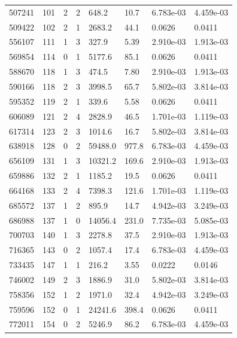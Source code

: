 \documentclass[preview]{standalone}
\begin{document}
{{{\begin{tabular}{L{1.2cm}C{1.2cm} C{0.3cm}C{0.5cm} C{1.4cm}C{1.4cm} C{1.4cm}C{1.4cm}}
  507241  &   101  & 2     &  2 &  648.2  & 10.7  & 6.783e-03 &  4.459e-03   \\ 
  509422  &   102  & 2     &  1 &  2683.2  & 44.1  & 0.0626 &  0.0411   \\ 
  556107  &   111  & 1     &  3 &  327.9  & 5.39  & 2.910e-03 &  1.913e-03   \\ 
  569854  &   114  & 0     &  1 &  5177.6  & 85.1  & 0.0626 &  0.0411   \\ 
  588670  &   118  & 1     &  3 &  474.5  & 7.80  & 2.910e-03 &  1.913e-03   \\ 
  590166  &   118  & 2     &  3 &  3998.5  & 65.7  & 5.802e-03 &  3.814e-03   \\ 
  595352  &   119  & 2     &  1 &  339.6  & 5.58  & 0.0626 &  0.0411   \\ 
  606089  &   121  & 2     &  4 &  2828.9  & 46.5  & 1.701e-03 &  1.119e-03   \\ 
  617314  &   123  & 2     &  3 &  1014.6  & 16.7  & 5.802e-03 &  3.814e-03   \\ 
  638918  &   128  & 0     &  2 &  59488.0  & 977.8  & 6.783e-03 &  4.459e-03   \\ 
  656109  &   131  & 1     &  3 &  10321.2  & 169.6  & 2.910e-03 &  1.913e-03   \\ 
  659886  &   132  & 2     &  1 &  1185.2  & 19.5  & 0.0626 &  0.0411   \\ 
  664168  &   133  & 2     &  4 &  7398.3  & 121.6  & 1.701e-03 &  1.119e-03   \\ 
  685572  &   137  & 1     &  2 &  895.9  & 14.7  & 4.942e-03 &  3.249e-03   \\ 
  686988  &   137  & 1     &  0 &  14056.4  & 231.0  & 7.735e-03 &  5.085e-03   \\ 
  700703  &   140  & 1     &  3 &  2278.8  & 37.5  & 2.910e-03 &  1.913e-03   \\ 
  716365  &   143  & 0     &  2 &  1057.4  & 17.4  & 6.783e-03 &  4.459e-03   \\ 
  733435  &   147  & 1     &  1 &  216.2  & 3.55  & 0.0222 &  0.0146   \\ 
  746002  &   149  & 2     &  3 &  1886.9  & 31.0  & 5.802e-03 &  3.814e-03   \\ 
  758356  &   152  & 1     &  2 &  1971.0  & 32.4  & 4.942e-03 &  3.249e-03   \\ 
  759596  &   152  & 0     &  1 &  24241.6  & 398.4  & 0.0626 &  0.0411   \\ 
  772011  &   154  & 0     &  2 &  5246.9  & 86.2  & 6.783e-03 &  4.459e-03   \\ 

\end{tabular}}}}
\end{document}
